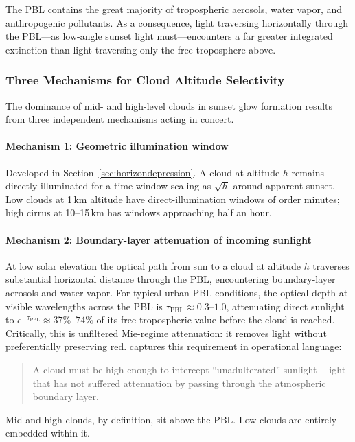 \documentclass[11pt,a4paper]{article}
\begin{document}
The PBL contains the great majority of tropospheric aerosols, water vapor, and anthropogenic pollutants. As a consequence, light traversing horizontally through the PBL---as low-angle sunset light must---encounters a far greater integrated extinction than light traversing only the free troposphere above.

\subsubsection{Three Mechanisms for Cloud Altitude Selectivity}

The dominance of mid- and high-level clouds in sunset glow formation results from three independent mechanisms acting in concert.

\paragraph{Mechanism 1: Geometric illumination window} Developed in Section~\ref{sec:horizondepression}. A cloud at altitude $h$ remains directly illuminated for a time window scaling as $\sqrt{h}$ around apparent sunset. Low clouds at 1\,km altitude have direct-illumination windows of order minutes; high cirrus at 10--15\,km has windows approaching half an hour.

\paragraph{Mechanism 2: Boundary-layer attenuation of incoming sunlight} At low solar elevation the optical path from sun to a cloud at altitude $h$ traverses substantial horizontal distance through the PBL, encountering boundary-layer aerosols and water vapor. For typical urban PBL conditions, the optical depth at visible wavelengths across the PBL is $\tau_{\text{PBL}} \approx 0.3$--$1.0$, attenuating direct sunlight to $e^{-\tau_{\text{PBL}}} \approx 37\%$--$74\%$ of its free-tropospheric value before the cloud is reached. Critically, this is unfiltered Mie-regime attenuation: it removes light without preferentially preserving red. \citet{corfidi2014colors} captures this requirement in operational language:
\begin{quote}
A cloud must be high enough to intercept ``unadulterated'' sunlight---light that has not suffered attenuation by passing through the atmospheric boundary layer.
\end{quote}
Mid and high clouds, by definition, sit above the PBL. Low clouds are entirely embedded within it.
\end{document}
